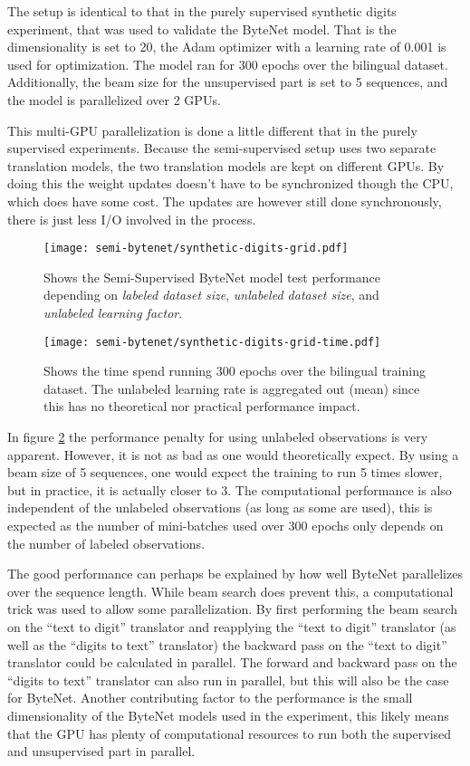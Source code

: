 The setup is identical to that in the purely supervised synthetic digits experiment, that was used to validate the ByteNet model. That is the dimensionality is set to 20, the Adam optimizer with a learning rate of 0.001 is used for optimization. The model ran for 300 epochs over the bilingual dataset. Additionally, the beam size for the unsupervised part is set to 5 sequences, and the model is parallelized over 2 GPUs.

This multi-GPU parallelization is done a little different that in the purely supervised experiments. Because the semi-supervised setup uses two separate translation models, the two translation models are kept on different GPUs. By doing this the weight updates doesn't have to be synchronized though the CPU, which does have some cost. The updates are however still done synchronously, there is just less I/O involved in the process.

\begin{figure}[h]
    \centering
    \texttt{[image: semi-bytenet/synthetic-digits-grid.pdf]}
    \caption{Shows the Semi-Supervised ByteNet model test performance depending on \textit{labeled dataset size}, \textit{unlabeled dataset size}, and \textit{unlabeled learning factor}.}
     \label{fig:result:semi-bytenet:missrate}
\end{figure}

\begin{figure}[h]
    \centering
    \texttt{[image: semi-bytenet/synthetic-digits-grid-time.pdf]}
    \caption{Shows the time spend running 300 epochs over the bilingual training dataset. The unlabeled learning rate is aggregated out (mean) since this has no theoretical nor practical performance impact.}
    \label{fig:result:semi-bytenet:time}
\end{figure}

In figure \ref{fig:result:semi-bytenet:time} the performance penalty for using unlabeled observations is very apparent. However, it is not as bad as one would theoretically expect. By using a beam size of 5 sequences, one would expect the training to run 5 times slower, but in practice, it is actually closer to 3. The computational performance is also independent of the unlabeled observations (as long as some are used), this is expected as the number of mini-batches used over 300 epochs only depends on the number of labeled observations.

The good performance can perhaps be explained by how well ByteNet parallelizes over the sequence length. While beam search does prevent this, a computational trick was used to allow some parallelization. By first performing the beam search on the ``text to digit'' translator and reapplying the ``text to digit'' translator (as well as the ``digits to text'' translator) the backward pass on the ``text to digit'' translator could be calculated in parallel. The forward and backward pass on the ``digits to text'' translator can also run in parallel, but this will also be the case for ByteNet. Another contributing factor to the performance is the small dimensionality of the ByteNet models used in the experiment, this likely means that the GPU has plenty of computational resources to run both the supervised and unsupervised part in parallel.

